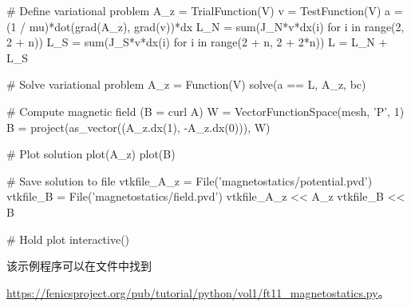 \begin{python}
# Define variational problem
A_z = TrialFunction(V)
v = TestFunction(V)
a = (1 / mu)*dot(grad(A_z), grad(v))*dx
L_N = sum(J_N*v*dx(i) for i in range(2, 2 + n))
L_S = sum(J_S*v*dx(i) for i in range(2 + n, 2 + 2*n))
L = L_N + L_S

# Solve variational problem
A_z = Function(V)
solve(a == L, A_z, bc)

# Compute magnetic field (B = curl A)
W = VectorFunctionSpace(mesh, 'P', 1)
B = project(as_vector((A_z.dx(1), -A_z.dx(0))), W)

# Plot solution
plot(A_z)
plot(B)

# Save solution to file
vtkfile_A_z = File('magnetostatics/potential.pvd')
vtkfile_B = File('magnetostatics/field.pvd')
vtkfile_A_z << A_z
vtkfile_B << B

# Hold plot
interactive()
\end{python}
该示例程序可以在文件中找到
\begin{center}
\url{https://fenicsproject.org/pub/tutorial/python/vol1/ft11_magnetostatics.py}。
\end{center}

